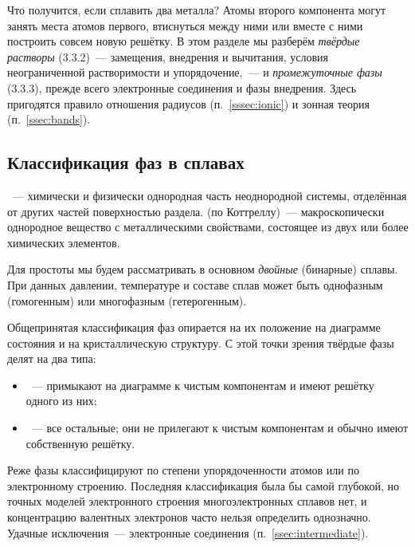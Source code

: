 \begin{orientir}
Что получится, если сплавить два металла? Атомы второго компонента
могут занять места атомов первого, втиснуться между ними или вместе с
ними построить совсем новую решётку. В этом разделе мы разберём
\emph{твёрдые растворы} (3.3.2)~— замещения, внедрения и вычитания,
условия неограниченной растворимости и упорядочение,~— и
\emph{промежуточные фазы} (3.3.3), прежде всего электронные соединения
и фазы внедрения. Здесь пригодятся правило отношения радиусов
(п.~\ref{sssec:ionic}) и зонная теория (п.~\ref{ssec:bands}).
\end{orientir}

\subsection{Классификация фаз в сплавах}\label{ssec:phase-class}

\begin{opredelenie}
~— химически и физически однородная часть неоднородной
системы, отделённая от других частей поверхностью раздела.
 (по Коттреллу)~— макроскопически однородное вещество с
металлическими свойствами, состоящее из двух или более химических
элементов.
\end{opredelenie}

Для простоты мы будем рассматривать в основном \emph{двойные} (бинарные)
сплавы. При данных давлении, температуре и составе сплав может быть
однофазным (гомогенным) или многофазным (гетерогенным).

Общепринятая классификация фаз опирается на их положение на диаграмме
состояния и на кристаллическую структуру. С этой точки зрения твёрдые
фазы делят на два типа:
\begin{itemize}
\item {}~— примыкают на диаграмме к
чистым компонентам и имеют решётку одного из них;
\item {}~— все остальные; они не прилегают к
чистым компонентам и обычно имеют собственную решётку.
\end{itemize}
Реже фазы классифицируют по степени упорядоченности атомов или по
электронному строению. Последняя классификация была бы самой
глубокой, но точных моделей электронного строения многоэлектронных
сплавов нет, и концентрацию валентных электронов часто нельзя
определить однозначно. Удачные исключения~— электронные соединения
(п.~\ref{ssec:intermediate}).

